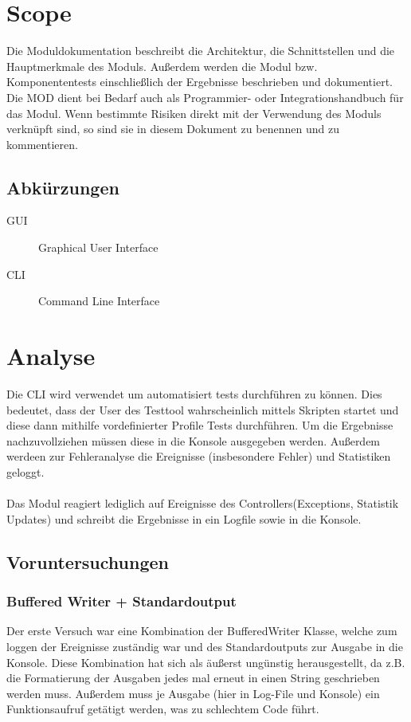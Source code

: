 
\chapter{Scope}
Die Moduldokumentation beschreibt die Architektur, die Schnittstellen 
und die Hauptmerkmale des Moduls. Außerdem werden die Modul bzw. Komponententests 
einschließlich der Ergebnisse beschrieben und dokumentiert. 
Die MOD dient bei Bedarf auch als Programmier- oder Integrationshandbuch für das 
Modul. Wenn bestimmte Risiken direkt mit der Verwendung des Moduls verknüpft sind,
so sind sie in diesem Dokument zu benennen und zu kommentieren.

\section{Abkürzungen}

	\begin{description}
	\item[GUI] Graphical User Interface
	\item[CLI] Command Line Interface
	\end{description}

\chapter{Analyse}
Die CLI wird verwendet um automatisiert tests durchführen zu können. Dies
bedeutet, dass der User des Testtool wahrscheinlich mittels Skripten startet und
diese dann mithilfe vordefinierter Profile Tests durchführen. Um die Ergebnisse
nachzuvollziehen müssen diese in die Konsole ausgegeben werden. Außerdem werdeen
zur Fehleranalyse die Ereignisse (insbesondere Fehler) und Statistiken geloggt.\\
\\
Das Modul reagiert lediglich auf Ereignisse des Controllers(Exceptions,
Statistik Updates) und schreibt die Ergebnisse in ein Logfile sowie in die
Konsole. 

\section{Voruntersuchungen}

\subsection{Buffered Writer + Standardoutput}
Der erste Versuch war eine Kombination der BufferedWriter Klasse, welche zum
loggen der Ereignisse zuständig war und des Standardoutputs zur Ausgabe in die
Konsole. Diese Kombination hat sich als äußerst ungünstig herausgestellt, da
z.B. die Formatierung der Ausgaben jedes mal erneut in einen String geschrieben
werden muss. Außerdem muss je Ausgabe (hier in Log-File und Konsole) ein
Funktionsaufruf getätigt werden, was zu schlechtem Code führt.

